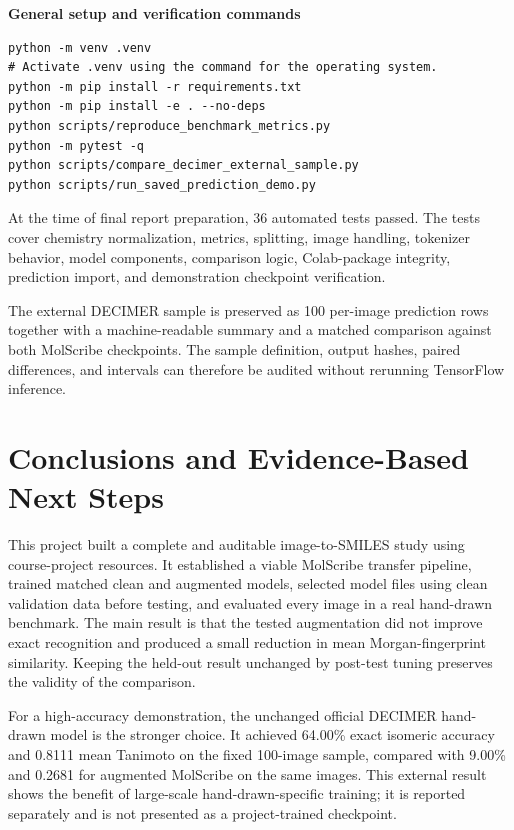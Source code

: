 \documentclass[11pt,a4paper]{article}
\begin{document}
\textbf{General setup and verification commands}

\begin{verbatim}
python -m venv .venv
# Activate .venv using the command for the operating system.
python -m pip install -r requirements.txt
python -m pip install -e . --no-deps
python scripts/reproduce_benchmark_metrics.py
python -m pytest -q
python scripts/compare_decimer_external_sample.py
python scripts/run_saved_prediction_demo.py
\end{verbatim}

At the time of final report preparation, 36 automated tests passed. The tests cover chemistry
normalization, metrics, splitting, image handling, tokenizer behavior, model components,
comparison logic, Colab-package integrity, prediction import, and demonstration checkpoint
verification.

The external DECIMER sample is preserved as 100 per-image prediction rows together with a
machine-readable summary and a matched comparison against both MolScribe checkpoints. The
sample definition, output hashes, paired differences, and intervals can therefore be audited
without rerunning TensorFlow inference.

\section*{Conclusions and Evidence-Based Next Steps}

This project built a complete and auditable image-to-SMILES study using course-project resources. It
established a viable MolScribe transfer pipeline, trained matched clean and augmented models,
selected model files using clean validation data before testing, and evaluated every image in a
real hand-drawn benchmark. The main
result is that the tested augmentation did not improve exact recognition and produced a small
reduction in mean Morgan-fingerprint similarity. Keeping the held-out result unchanged by
post-test tuning preserves the validity of the comparison.

For a high-accuracy demonstration, the unchanged official DECIMER hand-drawn model is the
stronger choice. It achieved 64.00\% exact isomeric accuracy and 0.8111 mean Tanimoto on the
fixed 100-image sample, compared with 9.00\% and 0.2681 for augmented MolScribe on the same
images. This external result shows the benefit of large-scale hand-drawn-specific training; it is
reported separately and is not presented as a project-trained checkpoint.
\end{document}

